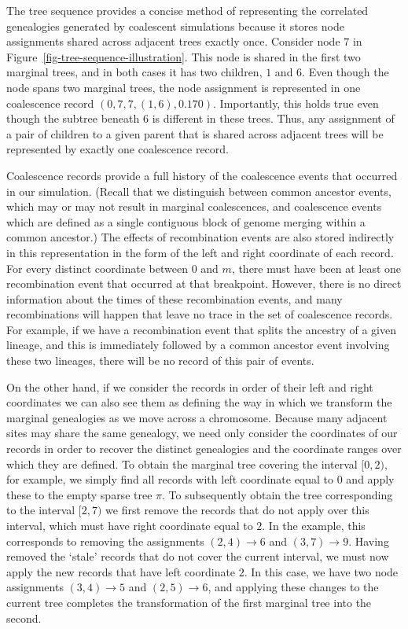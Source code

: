 \documentclass[10pt]{article}
\begin{document}
The tree sequence provides a concise method of representing the correlated
genealogies generated by coalescent simulations because it stores node
assignments shared across adjacent trees exactly once. Consider node $7$ in
Figure~\ref{fig-tree-sequence-illustration}. This node is shared in the first
two marginal trees, and in both cases it has two children, $1$ and $6$. Even though
the node spans two marginal trees, the node assignment is represented in one
coalescence record $(0, 7, 7, (1, 6), 0.170)$.  Importantly, this holds true
even though the subtree beneath $6$ is different in these trees. Thus, any
assignment of a pair of children to a given parent that is shared across
adjacent trees will be represented by exactly one coalescence record.

Coalescence records provide a full history of the coalescence events
that occurred in our simulation.
 (Recall that we distinguish between common ancestor events, which
may or may not result in marginal coalescences, and coalescence events which
are defined as a single contiguous block of genome merging within a common
ancestor.) The effects of recombination events are also stored indirectly in
this representation in the form of the left and right coordinate of each
record. For every distinct coordinate between $0$ and $m$, there must have been
at least one recombination event that occurred at that breakpoint. However,
there is no direct information about the times of these recombination events,
and many recombinations will happen that leave no trace in the set of
coalescence records. For example, if we have a recombination event that splits
the ancestry of a given lineage, and this is immediately followed by a common
ancestor event involving these two lineages, there will be no record of this
pair of events.

On the other hand, if we consider the records in order of their left and right coordinates
we can also see them as defining the way in which we transform the
marginal genealogies as we move across a chromosome.  Because many
adjacent sites may share the same genealogy, we need only consider the
coordinates of our records in order to recover the distinct genealogies and
the coordinate ranges over which they are defined. To obtain the marginal
tree covering the interval $[0, 2)$, for example, we simply find all records
with left coordinate equal to $0$ and apply these to the empty sparse tree
$\pi$. To subsequently obtain the tree corresponding to the interval $[2, 7)$
we first remove the records that do not apply over this interval, which must
have right coordinate equal to $2$. In the example, this corresponds to
removing the assignments $(2,4) \rightarrow 6$ and $(3, 7) \rightarrow 9$.
Having removed the `stale' records that do not cover the current interval, we
must now apply the new records that have left coordinate $2$. In this case, we
have two node assignments $(3,4) \rightarrow 5$ and $(2, 5) \rightarrow 6$, and
applying these changes to the current tree completes the transformation of the
first marginal tree into the second.
\end{document}
